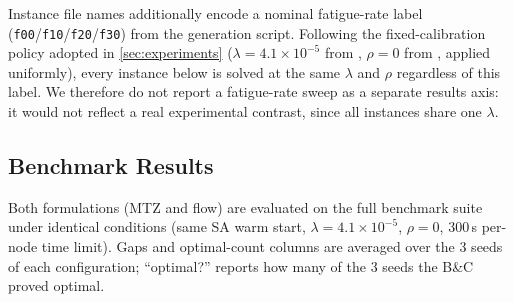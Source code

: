 \documentclass[11pt,a4paper]{article}
\begin{document}
Instance file names additionally encode a nominal fatigue-rate label (\texttt{f00}/\texttt{f10}/\texttt{f20}/\texttt{f30}) from the generation script.
Following the fixed-calibration policy adopted in \cref{sec:experiments} ($\lambda = 4.1\times10^{-5}$ from \citet{jaencarrillo2025}, $\rho = 0$ from \citet{vernillo2015}, applied uniformly), every instance below is solved at the same $\lambda$ and $\rho$ regardless of this label.
We therefore do not report a fatigue-rate sweep as a separate results axis: it would not reflect a real experimental contrast, since all instances share one $\lambda$.

\subsection{Benchmark Results}

Both formulations (MTZ and flow) are evaluated on the full benchmark suite under identical conditions (same SA warm start, $\lambda = 4.1\times10^{-5}$, $\rho = 0$, 300\,s per-node time limit).
Gaps and optimal-count columns are averaged over the 3 seeds of each configuration; ``optimal?'' reports how many of the 3 seeds the B\&C proved optimal.
\end{document}

